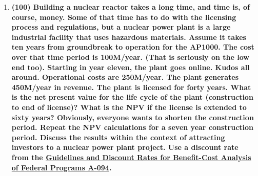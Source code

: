 \documentclass[11pt,a4paper]{article}
\begin{document}
\begin{enumerate}[leftmargin=*,topsep=0pt,font=\bfseries]
    \item\textbf{(100) Building a nuclear reactor takes a long time, and time is, of course, money. Some of that time has to do with the licensing process and regulations, but a nuclear power plant is a large industrial facility that uses hazardous materials. Assume it takes ten years from groundbreak to operation for the AP1000. The cost over that time period is 100M/year. (That is seriously on the low end too). Starting in year eleven, the plant goes online. Kudos all around. Operational costs are 250M/year. The plant generates 450M/year in revenue. The plant is licensed for forty years. What is the net present value for the life cycle of the plant (construction to end of license)? What is the NPV if the license is extended to sixty years? Obviously, everyone wants to shorten the construction period. Repeat the NPV calculations for a seven year construction period. Discuss the results within the context of attracting investors to a nuclear power plant project. Use a discount rate from the \href{https://www.whitehouse.gov/omb/information-for-agencies/circulars/}{Guidelines and Discount Rates for Benefit-Cost Analysis of Federal Programs A-094}.}
        \vspace{\baselineskip}
        
        
        
        
        
        
        
        
        
        
        
        
        
        
        
        
        
        
        
        
        
        
        
        
        
        
        
        
        
        
        
        
        
        
        

\end{enumerate}
\end{document}
